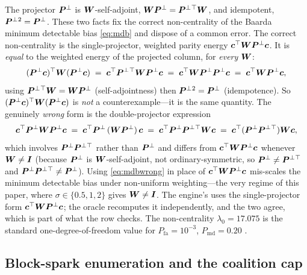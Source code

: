 The projector $\bm{P}^{\perp}$ is $\bm{W}$-self-adjoint, $\bm{W}\bm{P}^{\perp}=\bm{P}^{\perp}{}^\top\bm{W}$, and
idempotent, $\bm{P}^{\perp}{}^2=\bm{P}^{\perp}$. These two facts fix the correct non-centrality of the Baarda
minimum detectable bias \eqref{eq:mdb} and dispose of a common error. The correct
non-centrality is the single-projector, weighted parity energy $\bm c^\top\bm{W}\bm{P}^{\perp}\bm c$.
It is \emph{equal} to the weighted energy of the projected column, for \emph{every} $\bm{W}$:
\begin{equation}
  (\bm{P}^{\perp}\bm c)^\top\bm{W}(\bm{P}^{\perp}\bm c)
  \;=\;\bm c^\top\bm{P}^{\perp}{}^\top\bm{W}\bm{P}^{\perp}\bm c
  \;=\;\bm c^\top\bm{W}\bm{P}^{\perp}\bm{P}^{\perp}\bm c
  \;=\;\bm c^\top\bm{W}\bm{P}^{\perp}\bm c,
  \label{eq:mdbid}
\end{equation}
using $\bm{P}^{\perp}{}^\top\bm{W}=\bm{W}\bm{P}^{\perp}$ (self-adjointness) then $\bm{P}^{\perp}{}^2=\bm{P}^{\perp}$
(idempotence). So $(\bm{P}^{\perp}\bm c)^\top\bm{W}(\bm{P}^{\perp}\bm c)$ is \emph{not} a counterexample---it
is the same quantity. The genuinely \emph{wrong} form is the double-projector expression
\begin{equation}
  \bm c^\top\bm{P}^{\perp}\bm{W}\bm{P}^{\perp}\bm c
  \;=\;\bm c^\top\bm{P}^{\perp}\,(\bm{W}\bm{P}^{\perp})\,\bm c
  \;=\;\bm c^\top\bm{P}^{\perp}\bm{P}^{\perp}{}^\top\bm{W}\bm c
  \;=\;\bm c^\top(\bm{P}^{\perp}\bm{P}^{\perp}{}^\top)\bm{W}\bm c,
  \label{eq:mdbwrong}
\end{equation}
which involves $\bm{P}^{\perp}\bm{P}^{\perp}{}^\top$ rather than $\bm{P}^{\perp}$ and differs from $\bm c^\top\bm{W}
\bm{P}^{\perp}\bm c$ whenever $\bm{W}\neq\bm{I}$ (because $\bm{P}^{\perp}$ is $\bm{W}$-self-adjoint, not
ordinary-symmetric, so $\bm{P}^{\perp}\neq\bm{P}^{\perp}{}^\top$ and $\bm{P}^{\perp}\bm{P}^{\perp}{}^\top\neq\bm{P}^{\perp}$). Using
\eqref{eq:mdbwrong} in place of $\bm c^\top\bm{W}\bm{P}^{\perp}\bm c$ mis-scales the minimum detectable
bias under non-uniform weighting---the very regime of this paper, where $\sigma\in\{0.5,1,2\}$
gives $\bm{W}\neq\bm{I}$. The engine's  uses the single-projector form
$\bm c^\top\bm{W}\bm{P}^{\perp}\bm c$; the oracle recomputes it independently, and the two agree, which
is part of what the \Validated{} row checks. The non-centrality $\lambda_0=17.075$ is the
standard one-degree-of-freedom value for $P_{\mathrm{fa}}=10^{-3}$, $P_{\mathrm{md}}=0.20$
\citep{baarda1968,teunissen2006}.

\subsection{Block-spark enumeration and the coalition cap}
\label{app:blockspark}


